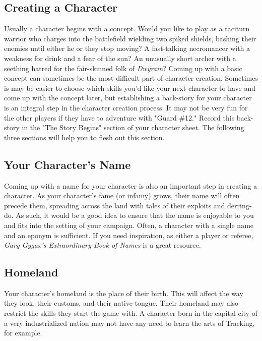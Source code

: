 \documentclass[oneside]{book}
\begin{document}
 \newpage
\begin{multicols}{2}
\section{Creating a Character}
Usually a character begins with a concept. Would you like to play as a taciturn warrior who charges into the battlefield wielding two spiked shields, bashing their enemies until either he or they stop moving? A fast-talking necromancer with a weakness for drink and a fear of the sun? An unusually short archer with a seething hatred for the fair-skinned folk of \emph{Dwyrain}?  Coming up with a basic concept can sometimes be the most difficult part of character creation. Sometimes is may be easier to choose which skills you'd like your next character to have and come up with the concept later, but establishing a back-story for your character is an integral step in the character creation process. It may not be very fun for the other players if they have to adventure with "Guard \#12." Record this back-story in the "The Story Begins" section of your character sheet. The following three sections will help you to flesh out this section.

\subsection{Your Character's Name}
Coming up with a name for your character is also an important step in creating a character. As your character's fame (or infamy) grows, their name will often precede them, spreading across the land with tales of their exploits and derring-do. As such, it would be a good idea to ensure that the name is enjoyable to you and fits into the setting of your campaign. Often, a character with a single name and an eponym is sufficient. If you need inspiration, as either a player or referee, \emph{Gary Gygax's Extraordinary Book of Names} is a great resource.

\subsection{Homeland}
Your character's homeland is the place of their birth. This will affect the way they look, their customs, and their native tongue. Their homeland may also restrict the skills they start the game with. A character born in the capital city of a very industrialized nation may not have any need to learn the arts of Tracking, for example. 


\end{multicols}
\end{document}
